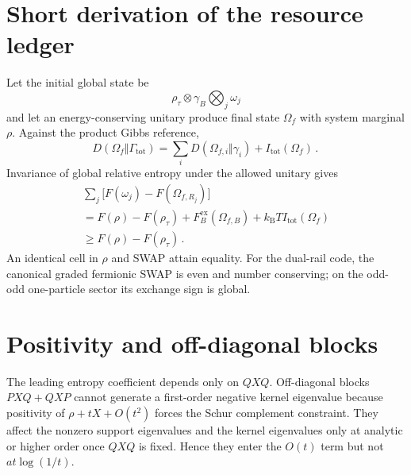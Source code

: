 \documentclass[11pt,a4paper]{article}
\theoremstyle{remark}
\begin{document}
\section{Short derivation of the resource ledger}
Let the initial global state be
\[
\rho_\tau\otimes \gamma_B \bigotimes_{j} \omega_j
\]
and let an energy-conserving unitary produce final state $\Omega_f$ with system marginal $\rho$. Against the product Gibbs reference,
\[
D(\Omega_f\Vert \Gamma_{\mathrm{tot}})=\sum_{i} D(\Omega_{f,i}\Vert \gamma_i)+I_{\mathrm{tot}}(\Omega_f)\mathpunct{.}
\]
Invariance of global relative entropy under the allowed unitary gives
\[
\begin{gathered}
\sum_{j}\bigl[F(\omega_j)-F(\Omega_{f,R_j})\bigr] \\
=F(\rho)-F(\rho_\tau)+F_B^{\mathrm{ex}}(\Omega_{f,B})+k_{\mathrm B} T I_{\mathrm{tot}}(\Omega_f) \\
\ge F(\rho)-F(\rho_\tau)\mathpunct{.}
\end{gathered}
\]
An identical cell in $\rho$ and SWAP attain equality. For the dual-rail code, the canonical graded fermionic SWAP is even and number conserving; on the odd-odd one-particle sector its exchange sign is global.
\section{Positivity and off-diagonal blocks}
The leading entropy coefficient depends only on $QXQ$. Off-diagonal blocks $PXQ+QXP$ cannot generate a first-order negative kernel eigenvalue because positivity of $\rho+tX+O(t^{2})$ forces the Schur complement constraint. They affect the nonzero support eigenvalues and the kernel eigenvalues only at analytic or higher order once $QXQ$ is fixed. Hence they enter the $O(t)$ term but not $a t \log(1/t)$.
\end{document}
